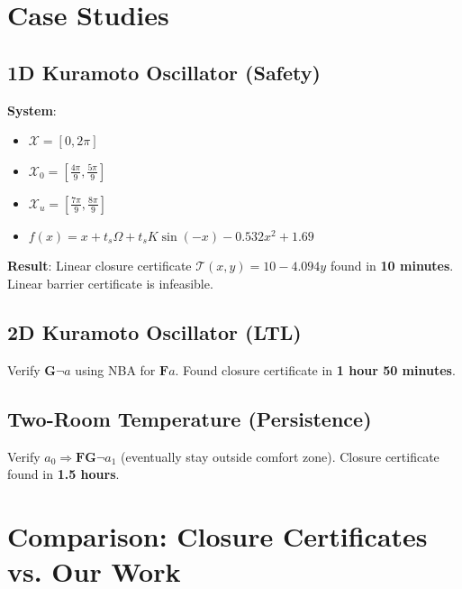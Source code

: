 \documentclass{article}
\begin{document}
\section{Case Studies}

\subsection{1D Kuramoto Oscillator (Safety)}

\textbf{System}:
\begin{itemize}
    \item $\mathcal{X} = [0, 2\pi]$
    \item $\mathcal{X}_0 = [\frac{4\pi}{9}, \frac{5\pi}{9}]$
    \item $\mathcal{X}_u = [\frac{7\pi}{9}, \frac{8\pi}{9}]$
    \item $f(x) = x + t_s \Omega + t_s K \sin(-x) - 0.532 x^2 + 1.69$
\end{itemize}

\textbf{Result}: Linear closure certificate $\mathcal{T}(x, y) = 10 - 4.094y$ found in \textbf{10 minutes}. Linear barrier certificate is infeasible.

\subsection{2D Kuramoto Oscillator (LTL)}

Verify $\mathbf{G}\neg a$ using NBA for $\mathbf{F}a$. Found closure certificate in \textbf{1 hour 50 minutes}.

\subsection{Two-Room Temperature (Persistence)}

Verify $a_0 \Rightarrow \mathbf{FG}\neg a_1$ (eventually stay outside comfort zone). Closure certificate found in \textbf{1.5 hours}.

\section{Comparison: Closure Certificates vs. Our Work}
\end{document}
